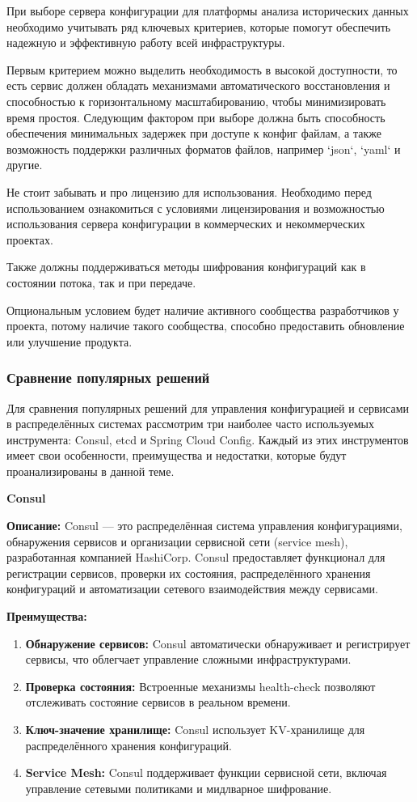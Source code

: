 При выборе сервера конфигурации для платформы анализа исторических данных необходимо учитывать ряд ключевых критериев,
которые помогут обеспечить надежную и эффективную работу всей инфраструктуры.

Первым критерием можно выделить необходимость в высокой доступности, то есть сервис должен обладать механизмами
автоматического
восстановления и способностью к горизонтальному масштабированию, чтобы минимизировать время простоя.
Следующим фактором при выборе должна быть способность обеспечения минимальных задержек при доступе к конфиг файлам,
а также возможность поддержки различных форматов файлов, например `json`, `yaml` и другие.

Не стоит забывать и про лицензию для использования.
Необходимо перед использованием ознакомиться с условиями
лицензирования и возможностью использования сервера конфигурации в коммерческих и некоммерческих проектах.

Также должны поддерживаться методы шифрования конфигураций как в состоянии потока, так и при передаче.

Опциональным условием будет наличие активного сообщества разработчиков у проекта, потому наличие такого сообщества,
способно предоставить обновление или улучшение продукта.

\subsubsection{Сравнение популярных решений}

Для сравнения популярных решений для управления конфигурацией и сервисами в распределённых системах рассмотрим три
наиболее часто используемых инструмента: Consul, etcd и Spring Cloud Config.
Каждый из этих инструментов имеет свои
особенности, преимущества и недостатки, которые будут проанализированы в данной теме.

\textbf{Consul}

\textbf{Описание:} Consul — это распределённая система управления конфигурациями, обнаружения сервисов и организации сервисной сети (service mesh), разработанная компанией HashiCorp.
Consul предоставляет функционал для регистрации сервисов, проверки их состояния, распределённого хранения конфигураций и автоматизации сетевого взаимодействия между сервисами.

\textbf{Преимущества:}
\begin{enumerate}[label=\arabic*.]
    \item \textbf{Обнаружение сервисов:} Consul автоматически обнаруживает и регистрирует сервисы, что облегчает управление сложными инфраструктурами.
    \item \textbf{Проверка состояния:} Встроенные механизмы health-check позволяют отслеживать состояние сервисов в реальном времени.
    \item \textbf{Ключ-значение хранилище:} Consul использует KV-хранилище для распределённого хранения конфигураций.
    \item \textbf{Service Mesh:} Consul поддерживает функции сервисной сети, включая управление сетевыми политиками и мидлварное шифрование.
\end{enumerate}

